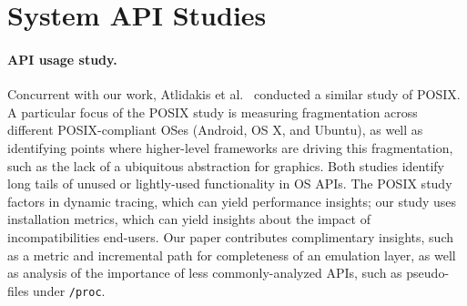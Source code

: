 \section{System API Studies}


\paragraph{API usage study.}
Concurrent with our work, Atlidakis et al.~\citep{atlidakis16posix} conducted a similar 
study of POSIX.
A particular focus of the POSIX study is measuring fragmentation across different POSIX-compliant OSes
(Android, OS X, and Ubuntu), as well as identifying points where higher-level frameworks
are driving this fragmentation, such as the lack of a ubiquitous abstraction for graphics.
Both studies identify long tails of unused or lightly-used functionality in OS APIs.
The POSIX study factors in dynamic tracing, which can yield performance insights;
our study uses installation metrics, which can yield insights about the impact of incompatibilities end-users.
Our paper contributes complimentary insights, such as a metric and incremental path for 
completeness of an emulation layer, as well as analysis of the importance of less commonly-analyzed 
APIs, such as pseudo-files under {\tt /proc}.



